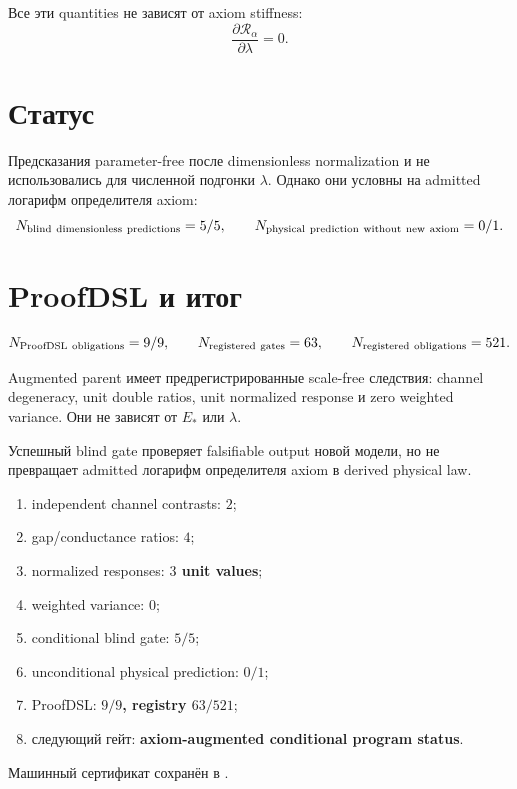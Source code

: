 Все эти quantities не зависят от axiom stiffness:
\begin{equation}
 \frac{\partial\mathcal R_\alpha}{\partial\lambda}=0.
 \label{eq:v9-kms-blind-stiffness}
\end{equation}

\section{Статус}

Предсказания parameter-free после dimensionless normalization и не
использовались для численной подгонки $\lambda$. Однако они условны на
admitted логарифм определителя axiom:
\begin{equation}
 N_{\rm blind\ dimensionless\ predictions}=5/5,
 \qquad
 N_{\rm physical\ prediction\ without\ new\ axiom}=0/1.
 \label{eq:v9-kms-blind-status}
\end{equation}

\section{ProofDSL и итог}

\begin{equation}
 N_{\rm ProofDSL\ obligations}=9/9,
 \qquad N_{\rm registered\ gates}=63,
 \qquad N_{\rm registered\ obligations}=521.
 \label{eq:v9-kms-blind-proofdsl}
\end{equation}

\begin{theorem}
Augmented parent имеет предрегистрированные scale-free следствия:
channel degeneracy, unit double ratios, unit normalized response и zero
weighted variance. Они не зависят от $E_*$ или $\lambda$.
\end{theorem}

\begin{nogocriterion}
Успешный blind gate проверяет falsifiable output новой модели, но не
превращает admitted логарифм определителя axiom в derived physical law.
\end{nogocriterion}

\begin{protocol}\begin{enumerate}
\item independent channel contrasts: \textbf{$2$};
\item gap/conductance ratios: \textbf{$4$};
\item normalized responses: \textbf{$3$ unit values};
\item weighted variance: \textbf{$0$};
\item conditional blind gate: \textbf{$5/5$};
\item unconditional physical prediction: \textbf{$0/1$};
\item ProofDSL: \textbf{$9/9$, registry $63/521$};
\item следующий гейт: \textbf{axiom-augmented conditional program status}.
\end{enumerate}\end{protocol}

Машинный сертификат сохранён в
.
